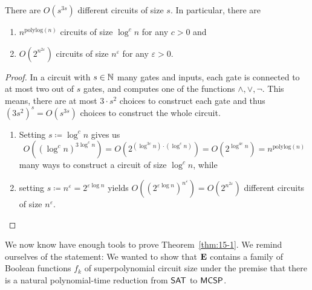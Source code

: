 \documentclass[11pt]{article}
\begin{document}
\begin{lemma}
  \label{lem:num-of-circs}
  There are $O(s^{3s})$ different circuits of size $s$.
  In particular, there are
  \begin{enumerate}
    \item $n^{\mathrm{polylog}(n)}$ circuits of size $\log^c n$ for any
      $c > 0$ and

    \item $O(2^{n^{2 \varepsilon}})$ circuits of size
      $n^\varepsilon$ for any $\varepsilon > 0$.
  \end{enumerate}
\end{lemma}

\begin{proof}
  In a circuit with $s \in {\mathbb{N}}$ many gates and inputs, each gate is connected to
  at most two out of $s$ gates, and computes one of the functions
  $\land, \lor, \neg$.
  This means, there are at most $3 \cdot s^2$ choices to construct each gate
  and thus $(3 s^2)^s = O(s^{3s})$ choices to construct the whole circuit.

  \begin{enumerate}
    \item Setting $s \coloneqq \log^c n$ gives us
      \[
        O((\log^c n)^{3 \log^c n})
        =
        O(2^{(\log^{3c} n) \cdot (\log^c n)})
        =
        O(2^{\log^{4c} n})
        =
        n^{\mathrm{polylog}(n)}
      \]
      many ways to construct a circuit of size $\log^c n$, while

    \item setting $s \coloneqq n^\varepsilon = 2^{\varepsilon \log n}$ yields
      $
        O((2^{\varepsilon \log n})^{n^\varepsilon})
        =
        O(2^{n^{2 \varepsilon}})
      $
      different circuits of size $n^\varepsilon$.
  \end{enumerate}
\end{proof}

We now know have enough tools to prove Theorem~\ref{thm:15-1}.
We remind ourselves of the statement: We wanted to show that $\mathbf{E}$
contains a family of Boolean functions $f_k$ of superpolynomial circuit
size under the premise that there is a natural polynomial-time reduction from
$\mathsf{SAT}$ to $\mathsf{MCSP}$.
\end{document}
